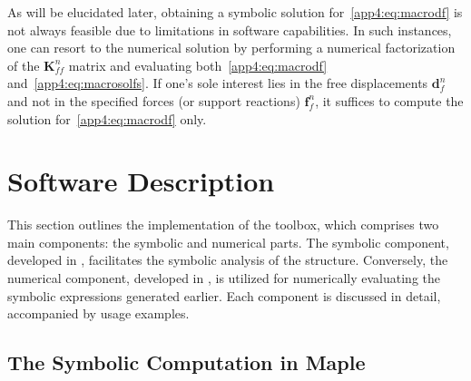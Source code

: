 %
As will be elucidated later, obtaining a symbolic solution for~\eqref{app4:eq:macrodf} is not always feasible due to limitations in software capabilities. In such instances, one can resort to the numerical solution by performing a numerical factorization of the $\mathbf{K}^{n}_{ff}$ matrix and evaluating both~\eqref{app4:eq:macrodf} and~\eqref{app4:eq:macrosolfs}. If one's sole interest lies in the free displacements $\mathbf{d}^{n}_{f}$ and not in the specified forces (or support reactions) $\mathbf{f}^{n}_{f}$, it suffices to compute the solution for~\eqref{app4:eq:macrodf} only.


\section{Software Description}
\label{app4:sec:software_description}

This section outlines the implementation of the \TrussMe{} toolbox, which comprises two main components: the symbolic and numerical parts. The symbolic component, developed in \Maple{}, facilitates the symbolic analysis of the structure. Conversely, the numerical component, developed in \Matlab{}, is utilized for numerically evaluating the symbolic expressions generated earlier. Each component is discussed in detail, accompanied by usage examples.

\subsection[The Symbolic Computation in \Maple{}]{The Symbolic Computation in Maple}
\label{app4:subsec:symbolic_computation}

